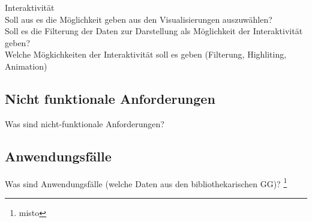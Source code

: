 Interaktivität\\
Soll aus es die Möglichkeit geben aus den Visualisierungen auszuwählen?\\
Soll es die Filterung der Daten zur Darstellung als Möglichkeit der Interaktivität geben?\\
Welche Mögkichkeiten der Interaktivität soll es geben (Filterung, Highliting, Animation)\\
\subsection{Nicht funktionale Anforderungen}
Was sind nicht-funktionale Anforderungen?
\subsection{Anwendungsfälle}
Was sind Anwendungsfälle (welche Daten aus den bibliothekarischen GG)? 
\footnote{misto}